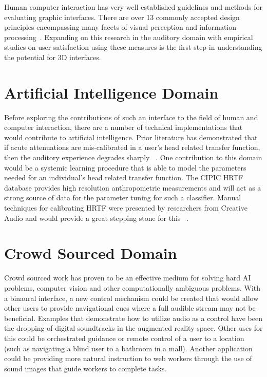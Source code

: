 Human computer interaction has very well established guidelines and methods for
evaluating graphic interfaces. There are over 13 commonly accepted design
principles encompassing many facets of visual perception and information
processing~\cite{wickens2004intro}. Expanding on this research in
the auditory domain with empirical studies on user satisfaction using these
measures is the first step in understanding the potential for 3D interfaces.


\section{                  Artificial Intelligence Domain                     }

Before exploring the contributions of such an interface to the field of human
and computer interaction, there are a number of technical implementations that
would contribute to artificial intelligence.  Prior literature has
demonstrated that if acute attenuations are mis-calibrated in a user's head
related transfer function, then the auditory experience degrades sharply
~\cite{algazi2001cipic}.  One contribution to this domain would be a systemic
learning procedure that is able to model the parameters needed for an
individual's head related transfer function.  The CIPIC HRTF database provides
high resolution anthropometric measurements and will act as a strong source of
data for the parameter tuning for such a classifier.  Manual techniques for
calibrating HRTF were presented by researchers from Creative Audio and would
provide a great stepping stone for this ~\cite{jost2000transaural}.


\section{                  Crowd Sourced Domain                               }

Crowd sourced work has proven to be an effective medium for solving hard AI
problems, computer vision and other computationally ambiguous problems.  With a
binaural interface, a new control mechanism could be created that would allow
other users to provide navigational cues where a full audible stream may not
be beneficial.  Examples that demonstrate how to utilize audio as a control have
been the dropping of digital soundtracks in the augmented reality space.  Other
uses for this could be orchestrated guidance or remote control of a user to a
location (such as navigating a blind user to a bathroom in a mall).  Another
application could be providing more natural instruction to web workers through
the use of sound images that guide workers to complete tasks.




